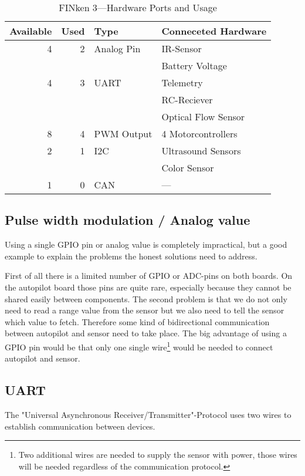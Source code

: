 \begin{table}[h]
	\centering
	\begin{tabular}{|r|r | l | l|}
		\hline
		Available  & Used & Type       & Conneceted Hardware \\ \hline \hline
		4          &   2  & Analog Pin & IR-Sensor \\
		           &      &            & Battery Voltage \\ \hline
		4          &   3  & UART       & Telemetry \\
		           &      &            & RC-Reciever\\
		           &      &            & Optical Flow Sensor\\ \hline
		8          &   4  & PWM Output & 4 Motorcontrollers\\ \hline
		2          &   1  & I2C        & Ultrasound Sensors\\ \hline
		           &      &            & Color Sensor\\ \hline
		1          &   0  & CAN        & — \\ \hline
	\end{tabular}
	\caption{FINken 3—Hardware Ports and Usage}
	\label{hwconnection}
\end{table}

\subsection{Pulse width modulation / Analog value}
Using a single GPIO pin or analog value is completely impractical, but a good example to explain the problems the honest solutions need to address.

First of all there is a limited number of GPIO or ADC-pins on both boards.
On the autopilot board those pins are quite rare, especially because they cannot be shared easily between components.
The second problem is that we do not only need to read a range value from the sensor but we also need to tell the sensor which value to fetch.
Therefore some kind of bidirectional communication between autopilot and sensor need to take place.
The big advantage of using a GPIO pin would be that only one single wire\footnote{Two additional wires are needed to supply the sensor with power, those wires will be needed regardless of the communication protocol.} would be needed to connect autopilot and sensor.

\subsection{UART}
The "Universal Asynchronous Receiver/Transmitter"-Protocol uses two wires to establish communication between devices.
\cite{wingen_automatic_2004}

